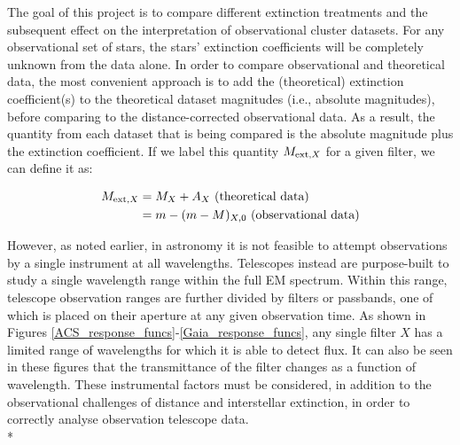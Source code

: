 \documentclass[12pt, a4paper]{report}
\begin{document}
The goal of this project is to compare different extinction treatments and the subsequent effect on the interpretation of observational cluster datasets. For any observational set of stars, the stars' extinction coefficients will be completely unknown from the data alone. In order to compare observational and theoretical  data, the most convenient approach is to add the (theoretical) extinction coefficient(s) to the theoretical dataset magnitudes (i.e., absolute magnitudes), before comparing to the distance-corrected observational data. As a result, the quantity from each dataset that is being compared is the absolute magnitude plus the extinction coefficient. If we label this quantity $M_{\textnormal{ext},X}$ for a given filter, we can define it as:

\begin{align}
\begin{split}
M_{\textnormal{ext},X} &= M_{X} + A_{X} \textnormal{ (theoretical data)}\\
 &= m - (m - M)_{X,0} \textnormal{ (observational data)}
\end{split}
\label{MextX_eq}
\end{align}


However, as noted earlier, in astronomy it is not feasible to attempt observations by a single instrument at all wavelengths. Telescopes instead are purpose-built to study a single wavelength range within the full EM spectrum. Within this range, telescope observation ranges are further divided by filters or passbands, one of which is placed on their aperture at any given observation time. As shown in Figures \ref{ACS_response_funcs}-\ref{Gaia_response_funcs}, any single filter $X$ has a limited range of wavelengths for which it is able to detect flux. It can also be seen in these figures that the transmittance of the filter changes as a function of wavelength. These instrumental factors must be considered, in addition to the observational challenges of distance and interstellar extinction, in order to correctly analyse observation telescope data. \\*

\end{document}
